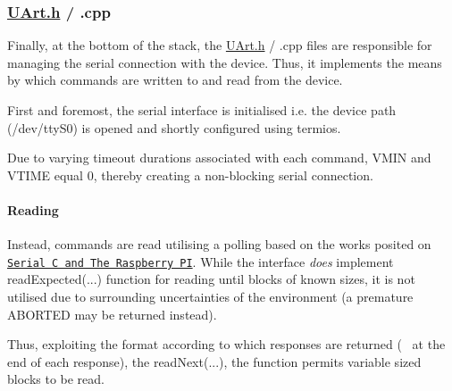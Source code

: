 \subsubsection*{\hyperlink{_u_art_8h}{U\+Art.\+h} / .cpp}

Finally, at the bottom of the stack, the \hyperlink{_u_art_8h}{U\+Art.\+h} / .cpp files are responsible for managing the serial connection with the device. Thus, it implements the means by which commands are written to and read from the device.

First and foremost, the serial interface is initialised i.\+e. the device path (/dev/tty\+S0) is opened and shortly configured using termios.
\begin{DoxyItemize}
\item Due to varying timeout durations associated with each command, V\+M\+IN and V\+T\+I\+ME equal 0, thereby creating a non-\/blocking serial connection.
\end{DoxyItemize}

\paragraph*{Reading}

Instead, commands are read utilising a polling based on the works posited on \href{https://www.i-programmer.info/programming/cc/10027-serial-c-and-the-raspberry-pi.html}{\tt Serial C and The Raspberry PI}. While the interface {\itshape does} implement \textquotesingle{}read\+Expected(...)\textquotesingle{} function for reading until blocks of known sizes, it is not utilised due to surrounding uncertainties of the environment (a premature A\+B\+O\+R\+T\+ED may be returned instead).

Thus, exploiting the format according to which responses are returned (~\newline
 at the end of each response), the \textquotesingle{}read\+Next(...)\textquotesingle{}, the function permits variable sized blocks to be read.


